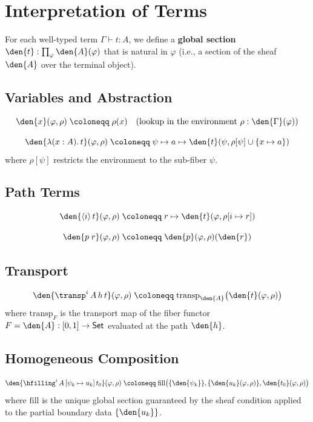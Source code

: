 \section{Interpretation of Terms}
\label{sec:term-interpretation}

For each well-typed term \(\Gamma \vdash t : A\), we define a
\textbf{global section} \(\den{t} : \prod_\varphi \den{A}(\varphi)\)
that is natural in \(\varphi\) (i.e., a section of the sheaf
\(\den{A}\) over the terminal object).

\subsection{Variables and Abstraction}

\[
  \den{x}(\varphi, \rho)
  \;\coloneqq\; \rho(x)
  \quad\text{(lookup in the environment \(\rho : \den{\Gamma}(\varphi)\))}
\]

\[
  \den{\lambda(x : A).\, t}(\varphi, \rho)
  \;\coloneqq\;
  \psi \mapsto a \mapsto \den{t}(\psi, \rho[\psi] \cup \{x \mapsto a\})
\]
where \(\rho[\psi]\) restricts the environment to the sub-fiber \(\psi\).

\subsection{Path Terms}

\[
  \den{\langle i \rangle\, t}(\varphi, \rho)
  \;\coloneqq\;
  r \mapsto \den{t}(\varphi, \rho[i \mapsto r])
\]

\[
  \den{p\; r}(\varphi, \rho)
  \;\coloneqq\; \den{p}(\varphi, \rho)(\den{r})
\]

\subsection{Transport}

\[
  \den{\transp^i\, A\, h\, t}(\varphi, \rho)
  \;\coloneqq\;
  \mathrm{transp}_{\den{A}}\bigl(\den{t}(\varphi, \rho)\bigr)
\]
where \(\mathrm{transp}_F\) is the transport map of the fiber functor
\(F = \den{A} : [0, 1] \to \mathsf{Set}\) evaluated at the path
\(\den{h}\).

\subsection{Homogeneous Composition}

\[
  \den{\hfilling^i\, A\, [\psi_k \mapsto u_k]\, t_0}(\varphi, \rho)
  \;\coloneqq\;
  \mathrm{fill}\bigl(
  \{\den{\psi_k}\}, \{\den{u_k}(\varphi, \rho)\}, \den{t_0}(\varphi, \rho)
  \bigr)
\]
where \(\mathrm{fill}\) is the unique global section guaranteed by the
sheaf condition applied to the partial boundary data
\(\{\den{u_k}\}\).

